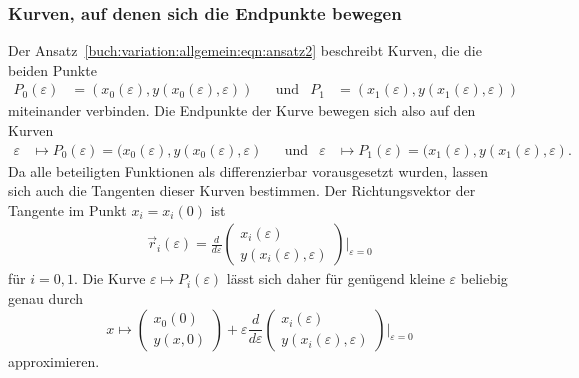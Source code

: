 \subsubsection{Kurven, auf denen sich die Endpunkte bewegen}
Der Ansatz~\eqref{buch:variation:allgemein:eqn:ansatz2} beschreibt
Kurven, die die beiden Punkte
\begin{align*}
P_0(\varepsilon)
&=
(x_0(\varepsilon),y(x_0(\varepsilon),\varepsilon))
&&\text{und}&
P_1
&=
(x_1(\varepsilon),y(x_1(\varepsilon),\varepsilon))
\end{align*}
miteinander verbinden.
Die Endpunkte der Kurve bewegen sich also auf den Kurven
\begin{align*}
\varepsilon
&\mapsto
P_0(\varepsilon)
=
(x_0(\varepsilon),y(x_0(\varepsilon),\varepsilon)
&&\text{und}&
\varepsilon
&\mapsto
P_1(\varepsilon)
=
(x_1(\varepsilon),y(x_1(\varepsilon),\varepsilon).
\end{align*}
Da alle beteiligten Funktionen als differenzierbar vorausgesetzt wurden,
lassen sich auch die Tangenten dieser Kurven bestimmen.
Der Richtungsvektor der Tangente im Punkt $x_i=x_i(0)$ ist
\begin{align}
\vec{r}_i(\varepsilon)
=
\frac{d}{d\varepsilon}
\begin{pmatrix}
x_i(\varepsilon)\\
y(x_i(\varepsilon),\varepsilon)
\end{pmatrix}
\bigg|_{\varepsilon=0}
\label{buch:variation:allgemein:eqn:tangential}
\end{align}
für $i=0,1$.
Die Kurve $\varepsilon\mapsto P_i(\varepsilon)$ lässt sich daher für
genügend kleine $\varepsilon$ beliebig genau durch
\[
x\mapsto
\begin{pmatrix}
x_0(0)\\
y(x,0) 
\end{pmatrix}
+
\varepsilon
\frac{d}{d\varepsilon}
\begin{pmatrix}
x_i(\varepsilon)\\
y(x_i(\varepsilon),\varepsilon)
\end{pmatrix}
\bigg|_{\varepsilon=0}
\]
approximieren.

%
%
